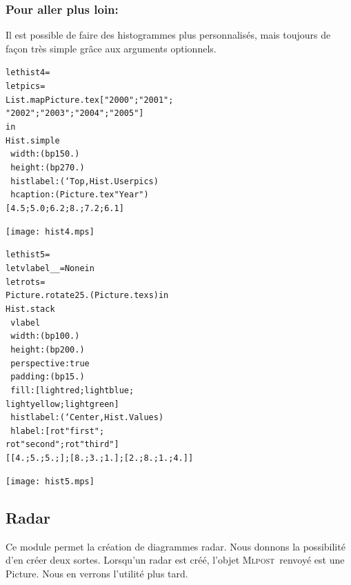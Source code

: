 \documentclass[a4paper,12pt]{article}
\newcommand{\mlpost}{\textsc{Mlpost}}
\begin{document}
\subsubsection{Pour aller plus loin:}
Il est possible de faire des histogrammes plus personnalisés, mais toujours de façon très simple grâce aux arguments optionnels.

\begin{minipage}{0.5\linewidth}
  \begin{alltt}
    let hist4 =
    let pics =
    List.map Picture.tex ["2000";"2001";
      "2002";"2003";"2004";"2005"]
    in
    Hist.simple 
    ~width:(bp 150.)
    ~height:(bp 270.)
    ~histlabel:(`Top, Hist.User pics)
    ~hcaption:(Picture.tex "Year")
    [4.5;5.0;6.2;8.;7.2;6.1]
  \end{alltt}
\end{minipage}
\begin{minipage}{0.5\linewidth}
\begin{center}
\texttt{[image: hist4.mps]}
\end{center}
\end{minipage}

\bigskip

\begin{minipage}{0.5\linewidth}
  \begin{alltt}
    let hist5 =
    let vlabel _ _ = None in
    let rot s = 
    Picture.rotate 25. (Picture.tex s) in
    Hist.stack
    ~vlabel
    ~width:(bp 100.)
    ~height:(bp 200.)
    ~perspective:true 
    ~padding:(bp 15.)
    ~fill:[lightred;lightblue;
      lightyellow;lightgreen]
    ~histlabel:(`Center, Hist.Values)
    ~hlabel:[rot "first";
      rot "second";rot "third" ]
    [[4.;5.;5.;]; [8.;3.;1.]; [2.;8.;1.;4.]]
  \end{alltt}
\end{minipage}
\begin{minipage}{0.5\linewidth}
\begin{center}
\texttt{[image: hist5.mps]}
\end{center}
\end{minipage}

\subsection{Radar}
Ce module permet la création de diagrammes radar.
Nous donnons la possibilité d'en créer deux sortes.
Lorsqu'un radar est créé, l'objet \mlpost\ renvoyé est une Picture.
Nous en verrons l'utilité plus tard.
\bigskip 
\end{document}
